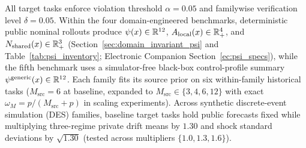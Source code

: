 All target tasks enforce violation threshold $\alpha = 0.05$ and familywise verification level $\delta = 0.05$. Within the four domain-engineered benchmarks, deterministic public nominal rollouts produce $\psi(x) \in \mathbb{R}^{12}$, $A_{\mathrm{local}}(x) \in \mathbb{R}_+^4$, and $N_{\mathrm{shared}}(x) \in \mathbb{R}_+^3$ (Section~\ref{sec:domain_invariant_psi} and Table~\ref{tab:psi_inventory}; Electronic Companion Section~\ref*{ec:psi_specs}), while the fifth benchmark uses a simulator-free black-box control-profile summary $\psi^{\mathrm{generic}}(x) \in \mathbb{R}^{12}$. Each family fits its source prior on six within-family historical tasks ($M_{\mathrm{src}}=6$ at baseline, expanded to $M_{\mathrm{src}} \in \{3, 4, 6, 12\}$ with exact $\omega_M = p/(M_{\mathrm{src}}+p)$ in scaling experiments). Across synthetic discrete-event simulation (DES) families, baseline target tasks hold public forecasts fixed while multiplying three-regime private drift means by $1.30$ and shock standard deviations by $\sqrt{1.30}$ (tested across multipliers $\{1.0, 1.3, 1.6\}$).
